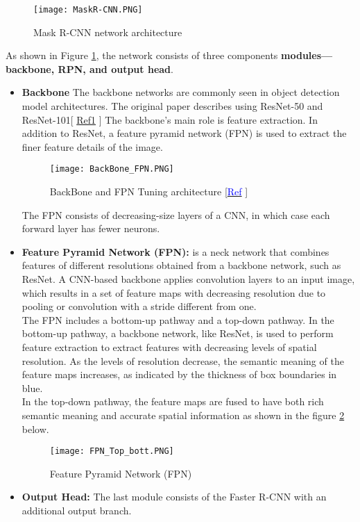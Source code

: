 \begin{figure}[H]
    \centering
    \texttt{[image: MaskR-CNN.PNG]}
    \caption{Mask R-CNN network architecture}
    \label{fig:MaskR-CNN}
\end{figure}
As shown in Figure \ref{fig:MaskR-CNN}, the network consists of three components \textbf{modules—backbone, RPN, and output head}.
\begin{itemize}
    \item \textbf{Backbone} The backbone networks are commonly seen in object detection model architectures. The original paper describes using ResNet-50 and ResNet-101[ \textcolor{red}{\href{https://arxiv.org/pdf/1612.03144.pdf}{Ref1}} ]
    The backbone’s main role is feature extraction.
    In addition to ResNet, a feature pyramid network (FPN) is used to extract the finer feature details of the image.
    \begin{figure}[H]
        \centering\texttt{[image: BackBone\_FPN.PNG]}
        \caption{BackBone and FPN Tuning architecture \protect\href{https://medium.com/@freshtechyy/fusing-backbone-features-using-feature-pyramid-network-fpn-c652aa6a264b}{[\textcolor{blue}{Ref}} ]}
    \end{figure}
The FPN consists of decreasing-size layers of a CNN, in which case each forward layer has fewer neurons.

        \item \textbf{Feature Pyramid Network (FPN): } is a neck network that combines features of different resolutions obtained from a backbone network, such as ResNet. A CNN-based backbone applies convolution layers to an input image, which results in a set of feature maps with decreasing resolution due to pooling or convolution with a stride different from one.\\
        The FPN includes a bottom-up pathway and a top-down pathway. In the bottom-up pathway, a backbone network, like ResNet, is used to perform feature extraction to extract features with decreasing levels of spatial resolution.
        As the levels of resolution decrease, the semantic meaning of the feature maps increases, as indicated by the thickness of box boundaries in blue.\\
        In the top-down pathway, the feature maps are fused to have both rich semantic meaning and accurate spatial information as shown in the figure \ref{fig:FPN_Arch} below.
        \begin{figure}[H]
            \centering
            \texttt{[image: FPN\_Top\_bott.PNG]}
            \caption{Feature Pyramid Network (FPN)}
            \label{fig:FPN_Arch}
        \end{figure}
         \item \textbf{Output Head: } The last module consists of the Faster R-CNN with an additional output branch. \cite{he2017mask}
\end{itemize}
   
